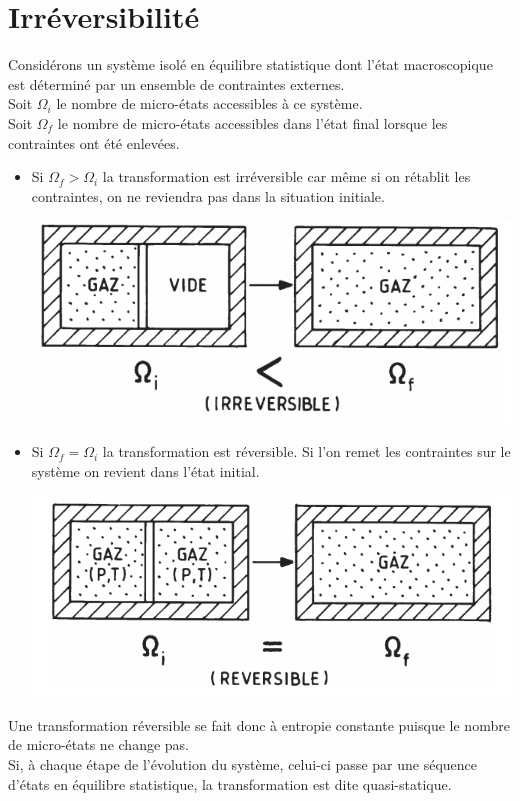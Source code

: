\documentclass[12pt,oneside]{book}
\begin{document}
\section{Irréversibilité}
Considérons un système isolé en équilibre statistique dont l'état macroscopique est déterminé par un ensemble de contraintes externes.\\
Soit $\Omega_i$ le nombre de micro-états accessibles à ce système.\\
Soit $\Omega_f$ le nombre de micro-états accessibles dans l'état final lorsque les contraintes ont été enlevées.\\
\begin{itemize}
	\item Si $\Omega_f > \Omega_i$ la transformation est irréversible car même si on rétablit les contraintes, on ne reviendra pas dans la situation initiale.
	      \begin{center}
		      \includegraphics[width=0.5\linewidth]{../pic/3306/14.png}
	      \end{center}
	\item Si $\Omega_f = \Omega_i$ la transformation est réversible. Si l'on remet les contraintes sur le système on revient dans l'état initial.
	      \begin{center}
		      \includegraphics[width=0.5\linewidth]{../pic/3306/15.png}
	      \end{center}
\end{itemize}
Une transformation réversible se fait donc à entropie constante puisque le nombre de micro-états ne change pas.\\
Si, à chaque étape de l'évolution du système, celui-ci passe par une séquence d'états en équilibre statistique, la transformation est dite quasi-statique.
\end{document}
